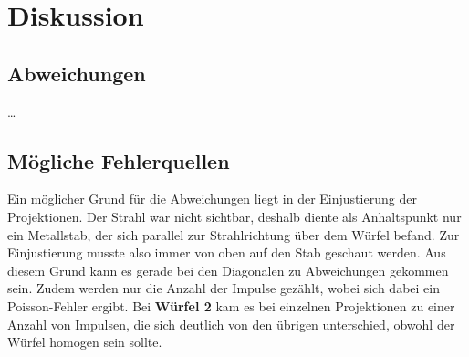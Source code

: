 \section{Diskussion}
\label{sec:diskussion}

\subsection{Abweichungen}

…


\subsection{Mögliche Fehlerquellen}

    Ein möglicher Grund für die Abweichungen liegt in der Einjustierung der Projektionen.
    Der Strahl war nicht sichtbar,
    deshalb diente als Anhaltspunkt nur ein Metallstab,
    der sich parallel zur Strahlrichtung über dem Würfel befand.
    Zur Einjustierung musste also immer von oben auf den Stab geschaut werden.
    Aus diesem Grund kann es gerade bei den Diagonalen zu Abweichungen gekommen sein.
    Zudem werden nur die Anzahl der Impulse gezählt,
    wobei sich dabei ein Poisson-Fehler ergibt.
    Bei \textbf{Würfel 2} kam es bei einzelnen Projektionen zu einer Anzahl von Impulsen,
    die sich deutlich von den übrigen unterschied,
    obwohl der Würfel homogen sein sollte.

